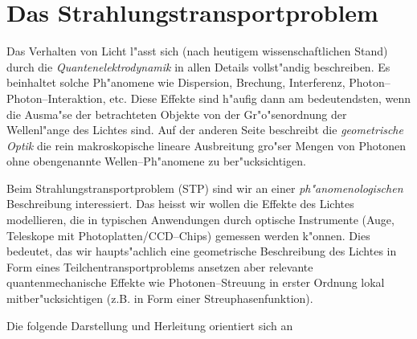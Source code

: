 \documentclass[11pt,a4paper,DIVcalc,BCOR8mm,titlepage,twoside]{scrartcl}
\begin{document}
	
	\section{Das Strahlungstransportproblem}
	\label{sec:radiative_transfer}
	
	Das Verhalten von Licht l"asst sich (nach heutigem wissenschaftlichen Stand) durch die {\em Quantenelektrodynamik} in allen Details vollst"andig beschreiben. Es beinhaltet solche Ph"anomene wie Dispersion, Brechung, Interferenz, Photon--Photon--Interaktion, etc. Diese Effekte sind h"aufig dann am bedeutendsten, wenn die Ausma"se der betrachteten Objekte von der Gr"o"senordnung der Wellenl"ange des Lichtes sind. Auf der anderen Seite beschreibt die {\em geometrische Optik} die rein makroskopische lineare Ausbreitung gro"ser Mengen von Photonen ohne obengenannte Wellen--Ph"anomene zu ber"ucksichtigen.
	
	Beim Strahlungstransportproblem (STP) sind wir an einer {\em ph"anomenologischen} Beschreibung interessiert. Das heisst wir wollen die Effekte des Lichtes modellieren, die in typischen Anwendungen durch optische Instrumente (Auge, Teleskope mit Photoplatten/CCD--Chips) gemessen werden k"onnen. Dies bedeutet, das wir haupts"achlich eine geometrische Beschreibung des Lichtes in Form eines Teilchentransportproblems ansetzen aber relevante quantenmechanische Effekte wie Photonen--Streuung in erster Ordnung lokal mitber"ucksichtigen (z.B. in Form einer Streuphasenfunktion).
	
	Die folgende Darstellung und Herleitung orientiert sich an \citep{Arvo:1993p9035}
	
\end{document}
